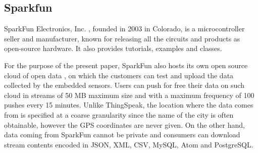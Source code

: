 \subsection{Sparkfun}
SparkFun Electronics, Inc. \cite{sparkfun}, founded in 2003 in Colorado, is a microcontroller seller and manufacturer, known for releasing all the circuits and products as open-source hardware.
It also provides tutorials, examples and classes.

For the purpose of the present paper, SparkFun also hosts its own open source cloud of open data \cite{sparkfundata}, on which the customers can test and upload the data collected by the embedded sensors.
Users can push for free their data on such cloud in streams of 50 MB maximum size and with a maximum frequency of 100 pushes every 15 minutes.
Unlike ThingSpeak, the location where the data comes from is specified at a coarse granularity since the name of the city is often obtainable, however the GPS coordinates are never given.
On the other hand, data coming from SparkFun cannot be private and consumers can download stream contents encoded in JSON, XML, CSV, MySQL, Atom and PostgreSQL.